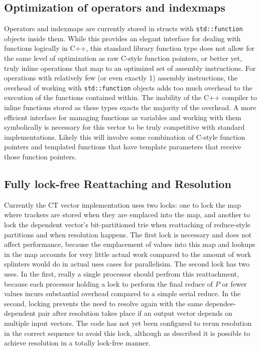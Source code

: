 \subsection{Optimization of operators and indexmaps}
Operators and indexmaps are currently stored in structs with
\texttt{std::function} objects inside them. While this provides an elegant
interface for dealing with functions logically in C++, this standard library
function type does not allow for the same level of optimization as raw C-style
function pointers, or better yet, truly inline operations that map to an
optimized set of assembly instructions. For operations with relatively few (or
even exactly 1) assembly instructions, the overhead of working with
\texttt{std::function} objects adds too much overhead to the execution of the
functions contained within. The inability of the C++ compiler to inline
functions stored as these types exacts the majority of the overhead. A more
efficient interface for managing functions as variables and working with them
symbolically is necessary for this vector to be truly competitive with standard
implementations. Likely this will involve some combination of C-style function
pointers and templated functions that have template parameters that receive
those function pointers.

\subsection{Fully lock-free Reattaching and Resolution}
Currently the CT vector implementation uses two locks: one to lock the map where
trackers are stored when they are emplaced into the map, and another to lock the
dependent vector's bit-partitioned trie when reattaching of reduce-style
partitions and when resolution happens. The first lock is necessary and does not
affect performance, because the emplacement of values into this map and lookups
in the map accounts for very little actual work compared to the amount of work
splinters would do in actual uses cases for parallelisim. The second lock has
two uses. In the first, really a single processor should perfrom this
reattachment, because each processor holding a lock to perform the final reduce
of $P$ or fewer values incurs substantial overhead compared to a simple serial
reduce. In the second, locking prevents the need to resolve again with the same
dependee-dependent pair after resolution takes place if an output vector depends
on multiple input vectors.  The code has not yet been configured to rerun
resolution in the correct sequence to avoid this lock, although as described it
is possible to achieve resolution in a totally lock-free manner.

